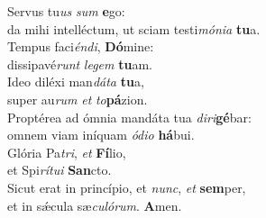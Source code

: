 \oddverse Servus tu\textit{us} \textit{sum} \textbf{e}go:~\*\\
\oddverse da mihi intelléctum, ut sciam testi\textit{mó}\textit{ni}\textit{a} \textbf{tu}a.\\
\evenverse Tempus faci\textit{én}\textit{di}, \textbf{Dó}mine:~\*\\
\evenverse dissipavé\textit{runt} \textit{le}\textit{gem} \textbf{tu}am.\\
\oddverse Ideo diléxi man\textit{dá}\textit{ta} \textbf{tu}a,~\*\\
\oddverse super au\textit{rum} \textit{et} \textit{to}\textbf{pá}zion.\\
\evenverse Proptérea ad ómnia mandáta tua \textit{di}\textit{ri}\textbf{gé}bar:~\*\\
\evenverse omnem viam iníquam \textit{ó}\textit{di}\textit{o} \textbf{há}bui.\\
\oddverse Glória Pa\textit{tri}, \textit{et} \textbf{Fí}lio,~\*\\
\oddverse et Spi\textit{rí}\textit{tu}\textit{i} \textbf{San}cto.\\
\evenverse Sicut erat in princípio, et \textit{nunc}, \textit{et} \textbf{sem}per,~\*\\
\evenverse et in sǽcula sæ\textit{cu}\textit{ló}\textit{rum}. \textbf{A}men.\\
